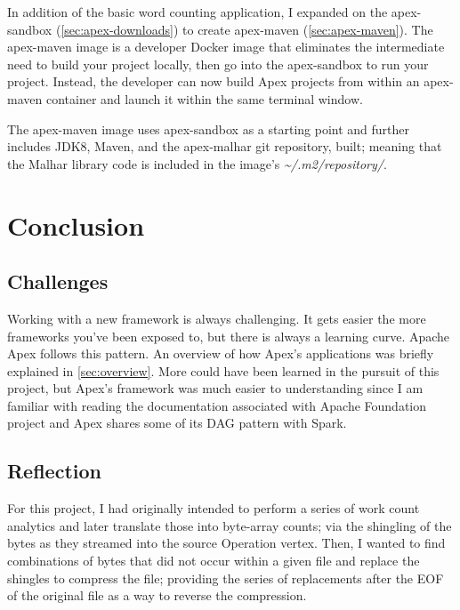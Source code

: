 \documentclass[final]{IEEEtran}
\begin{document}
In addition of the basic word counting application, I expanded on the apex-sandbox (\ref{sec:apex-downloads}) to create apex-maven (\ref{sec:apex-maven}). The apex-maven image is a developer Docker image that eliminates the intermediate need to build your project locally, then go into the apex-sandbox to run your project. Instead, the developer can now build Apex projects from within an apex-maven container and launch it within the same terminal window.

The apex-maven image uses apex-sandbox as a starting point and further includes JDK8, Maven, and the apex-malhar git repository, built; meaning that the Malhar library code is included in the image's \textsl{\textasciitilde/.m2/repository/}.

\section{Conclusion}
\subsection{Challenges}
Working with a new framework is always challenging. It gets easier the more frameworks you've been exposed to, but there is always a learning curve. Apache Apex follows this pattern. An overview of how Apex's applications was briefly explained in \ref{sec:overview}. More could have been learned in the pursuit of this project, but Apex's framework was much easier to understanding since I am familiar with reading the documentation associated with Apache Foundation project and Apex shares some of its DAG pattern with Spark.

\subsection{Reflection}
For this project, I had originally intended to perform a series of work count analytics and later translate those into byte-array counts; via the shingling of the bytes as they streamed into the source Operation vertex. Then, I wanted to find combinations of bytes that did not occur within a given file and replace the shingles to compress the file; providing the series of replacements after the EOF of the original file as a way to reverse the compression.
\end{document}
